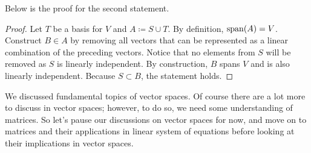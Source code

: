 \documentclass[../main.tex]{subfiles}
\begin{document}
Below is the proof for the second statement.

\begin{proof}
Let $T$ be a basis for $V$ and $A \coloneqq S \cup T$. By definition,
$\operatorname{span}(A) = V$. Construct $B \in A$ by removing all vectors that can
be represented as a linear combination of the preceding vectors.
Notice that no elements from $S$ will be removed as $S$ is linearly
independent. By construction, $B$ spans $V$ and is also linearly
independent. Because $S \subset B$, the statement holds.
\end{proof}

We discussed fundamental topics of vector spaces. Of course there
are a lot more to discuss in vector spaces; however, to do so,
we need some understanding of matrices. So let's pause our discussions
on vector spaces for now, and move on to matrices and their
applications in linear system of equations before looking at their
implications in vector spaces.
\end{document}
